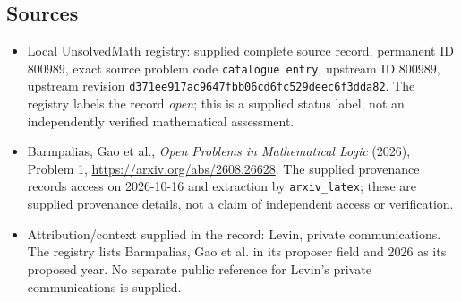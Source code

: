 \documentclass[11pt]{article}
\begin{document}
\subsection{Sources}
\begin{itemize}
\item Local UnsolvedMath registry: supplied complete source record, permanent ID $800989$, exact source problem code \texttt{catalogue entry}, upstream ID $800989$, upstream revision \texttt{d371ee917ac9647fbb06cd6fc529deec6f3dda82}. The registry labels the record \emph{open}; this is a supplied status label, not an independently verified mathematical assessment.
\item Barmpalias, Gao et al., \emph{Open Problems in Mathematical Logic} (2026), Problem 1, \url{https://arxiv.org/abs/2608.26628}. The supplied provenance records access on 2026-10-16 and extraction by \texttt{arxiv\_latex}; these are supplied provenance details, not a claim of independent access or verification.
\item Attribution/context supplied in the record: Levin, private communications. The registry lists Barmpalias, Gao et al. in its proposer field and 2026 as its proposed year. No separate public reference for Levin's private communications is supplied.
\end{itemize}
\end{document}
